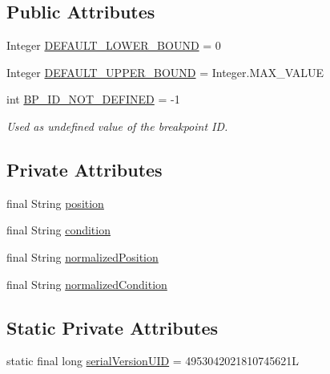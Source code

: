 \subsection*{Public Attributes}
\begin{DoxyCompactItemize}
\item 
Integer \hyperlink{interfacegov_1_1nasa_1_1jpf_1_1inspector_1_1interfaces_1_1_break_point_creation_information_a40131b93f82a84ed5322c4dc5ca4175e}{D\+E\+F\+A\+U\+L\+T\+\_\+\+L\+O\+W\+E\+R\+\_\+\+B\+O\+U\+ND} = 0
\item 
Integer \hyperlink{interfacegov_1_1nasa_1_1jpf_1_1inspector_1_1interfaces_1_1_break_point_creation_information_af917e7de77b2a6fc93c24e1c5a4a5759}{D\+E\+F\+A\+U\+L\+T\+\_\+\+U\+P\+P\+E\+R\+\_\+\+B\+O\+U\+ND} = Integer.\+M\+A\+X\+\_\+\+V\+A\+L\+UE
\item 
int \hyperlink{interfacegov_1_1nasa_1_1jpf_1_1inspector_1_1interfaces_1_1_break_point_creation_information_a24626231e3744e59f505d0731d4ca9e1}{B\+P\+\_\+\+I\+D\+\_\+\+N\+O\+T\+\_\+\+D\+E\+F\+I\+N\+ED} = -\/1
\begin{DoxyCompactList}\small\item\em Used as undefined value of the breakpoint ID. \end{DoxyCompactList}\end{DoxyCompactItemize}
\subsection*{Private Attributes}
\begin{DoxyCompactItemize}
\item 
final String \hyperlink{classgov_1_1nasa_1_1jpf_1_1inspector_1_1server_1_1breakpoints_1_1_assert_status_impl_a9da5ea3a1a030a104a9f85a8117b0cc2}{position}
\item 
final String \hyperlink{classgov_1_1nasa_1_1jpf_1_1inspector_1_1server_1_1breakpoints_1_1_assert_status_impl_a80225e7436ecf96c05cf5406e2fba2bf}{condition}
\item 
final String \hyperlink{classgov_1_1nasa_1_1jpf_1_1inspector_1_1server_1_1breakpoints_1_1_assert_status_impl_a03dc67a974cdd18f1ca9d3975b0ad0df}{normalized\+Position}
\item 
final String \hyperlink{classgov_1_1nasa_1_1jpf_1_1inspector_1_1server_1_1breakpoints_1_1_assert_status_impl_acf2ab1f79d37f27dca96a7b3da964d36}{normalized\+Condition}
\end{DoxyCompactItemize}
\subsection*{Static Private Attributes}
\begin{DoxyCompactItemize}
\item 
static final long \hyperlink{classgov_1_1nasa_1_1jpf_1_1inspector_1_1server_1_1breakpoints_1_1_assert_status_impl_a7be250aed4cc843648238a13d15efced}{serial\+Version\+U\+ID} = 4953042021810745621L
\end{DoxyCompactItemize}


